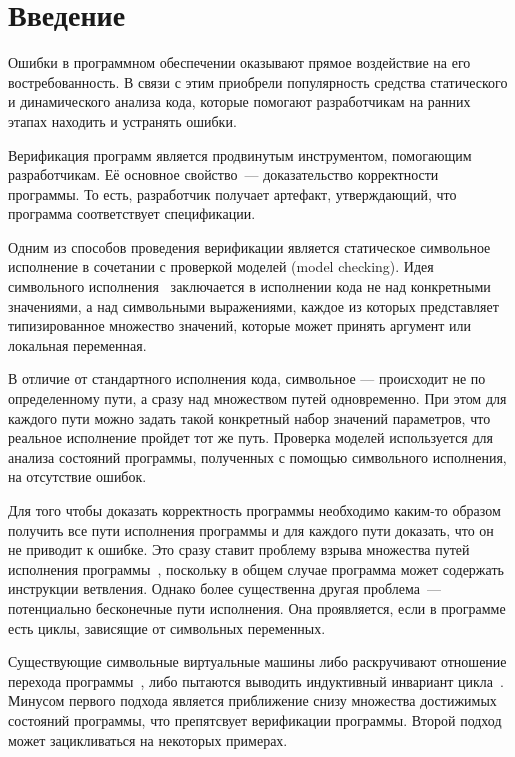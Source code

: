 \section*{Введение}
Ошибки в программном обеспечении оказывают прямое воздействие на его востребованность. 
В связи с этим приобрели популярность средства статического и динамического анализа кода, 
которые помогают разработчикам на ранних этапах находить и устранять ошибки.

Верификация программ является продвинутым инструментом, помогающим разработчикам. Её основное свойство~--- доказательство корректности программы. То есть, 
разработчик получает артефакт, утверждающий, что программа соответствует спецификации.

Одним из способов проведения верификации является статическое символьное исполнение в сочетании с проверкой моделей \foreignlanguage{english}{(model checking)}.
Идея символьного исполнения~\cite{king1976symbolic} заключается в исполнении кода не над конкретными значениями, а над символьными выражениями, каждое из которых представляет типизированное множество значений, которые может принять аргумент или локальная переменная.

В отличие от стандартного исполнения кода, символьное --- происходит не по определенному пути,
а сразу над множеством путей одновременно. При этом для каждого пути можно задать такой конкретный набор значений параметров, что реальное исполнение пройдет тот же путь. Проверка моделей используется для анализа состояний программы, полученных с помощью символьного исполнения, на отсутствие ошибок.

Для того чтобы доказать корректность программы необходимо каким-то образом получить все пути исполнения программы и для каждого пути доказать, что он не приводит к ошибке. Это сразу ставит проблему взрыва множества путей исполнения программы~\cite{baldoni2018survey}, 
поскольку в общем случае программа может содержать инструкции ветвления. 
Однако более существенна другая проблема~--- потенциально бесконечные пути исполнения. Она проявляется, если в программе есть циклы, зависящие от символьных переменных.

Существующие символьные виртуальные машины либо раскручивают отношение перехода программы~\cite{mcmillan2010lazy}, либо пытаются выводить индуктивный инвариант цикла~\cite{jaffar2012tracer}. Минусом первого подхода является приближение снизу множества достижимых состояний программы, что препятсвует верификации программы. 
Второй подход может зацикливаться на некоторых примерах.

